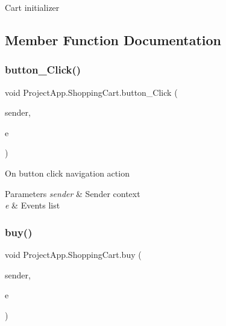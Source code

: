 Cart initializer 



\subsection{Member Function Documentation}
\mbox{\label{class_project_app_1_1_shopping_cart_aaebbb0f6f8dcbae842556c7c5515f8b2}} 
\subsubsection{\texorpdfstring{button\+\_\+\+Click()}{button\_Click()}}
{\footnotesize\ttfamily void Project\+App.\+Shopping\+Cart.\+button\+\_\+\+Click (\begin{DoxyParamCaption}\item[{object}]{sender,  }\item[{Routed\+Event\+Args}]{e }\end{DoxyParamCaption})\hspace{0.3cm}{\ttfamily [private]}}



On button click navigation action 


\begin{DoxyParams}{Parameters}
{\em sender} & Sender context\\
\hline
{\em e} & Events list\\
\hline
\end{DoxyParams}
\mbox{\label{class_project_app_1_1_shopping_cart_a157d531a399c820c0ae7dfa04c171a75}} 
\subsubsection{\texorpdfstring{buy()}{buy()}}
{\footnotesize\ttfamily void Project\+App.\+Shopping\+Cart.\+buy (\begin{DoxyParamCaption}\item[{object}]{sender,  }\item[{Routed\+Event\+Args}]{e }\end{DoxyParamCaption})\hspace{0.3cm}{\ttfamily [private]}}



